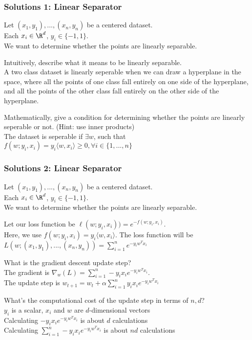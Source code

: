 \documentclass{beamer}
\renewenvironment{enumerate}%
{\begin{list}{\arabic{enumi}.}%
      {\setlength{\leftmargin}{2.5em}%
       \setlength{\itemsep}{-\parsep}%
       \setlength{\topsep}{-\parskip}%
       \usecounter{enumi}}%
 }{\end{list}}
\begin{document}
\begin{frame}
\frametitle{Solutions 1: Linear Separator }
Let $(x_1,y_1),...,(x_n,y_n)$ be a centered dataset. \\
Each $x_i\in\R^d$, $y_i\in\{-1,1\}$.\\
We want to determine whether the points are linearly separable.
\begin{solution}
\begin{enumerate}
\item Intuitively, describe what it means to be linearly separable. \\
A two class dataset is linearly seperable when we can draw a hyperplane in the space, 
where all the points of one class fall entirely on one side of the hyperplane, and all the points of the other class fall entirely on the other side of the hyperplane.\\
\medskip
\item Mathematically, give a condition for determining whether the points are linearly seperable or not. (Hint: use inner products)\\
The dataset is seperable if $\exists w$, such that \\
\quad $f(w;y_i,x_i) = y_i\langle w,x_i \rangle \geq 0, \forall i \in \{1,...,n\}$

\end{enumerate}
\end{solution}
\end{frame}


\begin{frame}
\frametitle{Solutions 2: Linear Separator }
Let $(x_1,y_1),...,(x_n,y_n)$ be a centered dataset. \\
Each $x_i\in\R^d$, $y_i\in\{-1,1\}$.\\
We want to determine whether the points are linearly separable.
\begin{solution}
\begin{enumerate}

\item[3.] Let our loss function be $\ell(w;y_i,x_i)) = e^{-f(w;y_i,x_i)}$.\\
Here, we use $f(w;y_i,x_i) =  y_i \langle w,x_i \rangle$.
The loss function will be $L(w;(x_1, y_1),...,(x_n, y_n)) = \sum_{i=1}^{n}e^{-y_iw^Tx_i}$
\item[4.] What is the gradient descent update step?\\
The gradient is $\nabla_w(L) = \sum_{i=1}^{n}-y_i x_i e^{-y_iw^Tx_i}$.\\
The update step is $w_{t+1} = w_t  + \alpha \sum_{i=1}^{n}y_i x_i e^{-y_iw^Tx_i}$
\item[5.] What's the computational cost of the update step in terms of $n, d$?\\
$y_i$ is a scalar, $x_i$ and $w$ are $d$-dimensional vectors\\
Calculating $-y_ix_ie^{-y_iw^Tx_i}$ is about $d$ calculations\\
Calculating $\sum_{i=1}^{n}-y_i x_i e^{-y_iw^Tx_i}$ is about $nd$ calculations

\end{enumerate}
\end{solution}
\end{frame}
\end{document}

